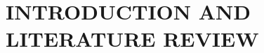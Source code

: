 \documentclass[12pt]{report}
\begin{document}
\renewcommand{\tamumanuscripttitle}{Adjoint-based sensitivity for radiation transport using an Eddington tensor formulation}

\renewcommand{\tamupapertype}{Thesis}

\renewcommand{\tamufullname}{Ian Halvic}

\renewcommand{\tamudegree}{Master of Science}
\renewcommand{\tamuchairone}{Professor Jean Ragusa}


\renewcommand{\tamumemberone}{Professor Marvin Adams}
\newcommand{\tamumembertwo}{Professor Bojan Popov}
\renewcommand{\tamudepthead}{Professor Yassin Hassan}

\renewcommand{\tamugradmonth}{XXXXX}
\renewcommand{\tamugradyear}{2017}
\renewcommand{\tamudepartment}{Nuclear Engineering}











\pagestyle{plain} %
\setcounter{page}{1}


\chapter{\uppercase {Introduction and Literature Review}}

\end{document}
